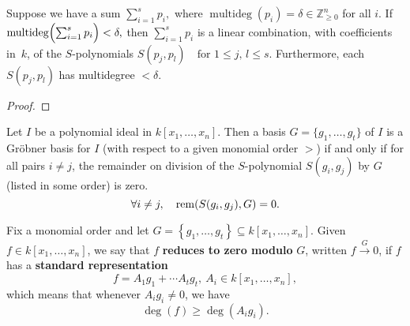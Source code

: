 \begin{lemma}\label{lem:exists_S_polynomial_syzygies} %
    \leanok %
    Suppose we have a sum $\sum_{i=1}^s p_i,$ where $\operatorname{multideg}(p_i)=\delta\in\mathbb Z_{\ge0}^n$ for all $i$.
    If $\operatorname{multideg}\Bigl(\sum_{i=1}^s p_i\Bigr)<\delta,$ then $\sum_{i=1}^s p_i$ is a linear combination, with coefficients in~$k$, of the $S$-polynomials $S(p_j,p_l)\quad\text{for }1\le j,\,l\le s$.
    Furthermore, each $S(p_j,p_l)$ has multidegree $<\delta$.
\end{lemma}
\begin{proof}
  \leanok %
\end{proof}

\begin{theorem}\label{thm:Buchberger’s Criterion} %
    Let $I$ be a polynomial ideal in $k[x_1, \dots, x_n]$. 
    Then a basis $G = \{g_1, \dots , g_t\}$ of $I$ is a Gr{\"o}bner basis for $I$ (with respect to a given monomial order $>$)
    if and only if for all pairs $i \neq j$, the remainder on division of the $S$-polynomial $S(g_i, g_j)$ by $G$ (listed in some order) is zero.
    \[ \forall i \neq j, \quad \operatorname{rem}(S(g_i, g_j), G) = 0. \]
\end{theorem}

\begin{definition}\label{def:reduces_to_zero} %
    Fix a monomial order and let $G = \left\{g_1, \ldots , g_t\right\} \subseteq k[x_1, \ldots , x_n]$.
    Given $f \in k[x_1, \ldots , x_n]$, we say that $f$ \textbf{reduces to zero modulo} $G$, written $f \xrightarrow{G} 0$,
    if $f$ has a \textbf{standard representation}
    \[ f = A_1g_1 + \cdots A_tg_t,\ A_i \in k[x_1, \ldots , x_n],\]
    which means that whenever $A_ig_i \neq 0$, we have
    \[\operatorname{deg}(f) \geq \operatorname{deg}(A_ig_i).\]
\end{definition}

